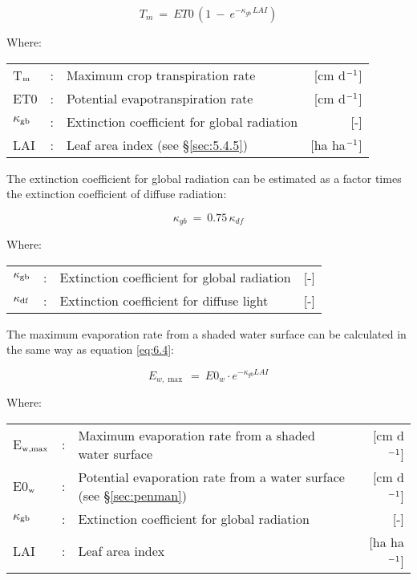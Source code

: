 \begin{equation}
\label{eq:6.4}
T _{m} ~=~ ET0\, (1~-~e ^{-\kappa _{gb} \, LAI} )
\end{equation}
 
Where:\\[5pt]
\begin{tabularx}{\textwidth}{llXr}
T$_{{\rm m}}$ &:& Maximum crop transpiration rate & [cm d$^{{\rm -1}}$]\\
ET0 &:& Potential evapotranspiration rate & [cm d$^{{\rm -1}}$]\\
$\kappa$$_{{\rm gb}}$ &:& Extinction coefficient for global radiation & [-]\\
LAI &:& Leaf area index (see \S \ref{sec:5.4.5}) & [ha ha$^{{\rm -1}}$]\\
\end{tabularx}

The extinction coefficient for global radiation can be estimated as a factor times the
extinction coefficient of diffuse radiation:

\begin{equation}
\label{eq:6.5}
\kappa_{gb} ~=~ 0.75\, \kappa_{df} 
\end{equation}

Where:\\[5pt]
\begin{tabularx}{\textwidth}{llXr}
$\kappa_{{\rm gb}}$ &:& Extinction coefficient for global radiation & [-]\\
$\kappa_{{\rm df}}$ &:& Extinction coefficient for diffuse light & [-]\\
\end{tabularx}

The maximum evaporation rate from a shaded water surface can be calculated in the same
way as equation \ref{eq:6.4}: 

\begin{equation}
\label{eq:6.6}
E_{w,\max } ~=~ E0_{w} \cdot e^{-\kappa_{gb} LAI}
\end{equation}

Where:\\[5pt]
\begin{tabularx}{\textwidth}{llXr}
E$_{{\rm w,max}}$ &:& Maximum evaporation rate from a shaded water surface & 
    [cm d$^{{\rm -1}}$]\\
E0$_{{\rm w}}$ &:& Potential evaporation rate from a water surface 
    (see \S \ref{sec:penman}) & [cm d$^{{\rm -1}}$]\\
$\kappa$$_{{\rm gb}}$ &:& Extinction coefficient for global radiation & [-]\\
LAI &:& Leaf area index & [ha ha$^{{\rm -1}}$]\\
\end{tabularx}


